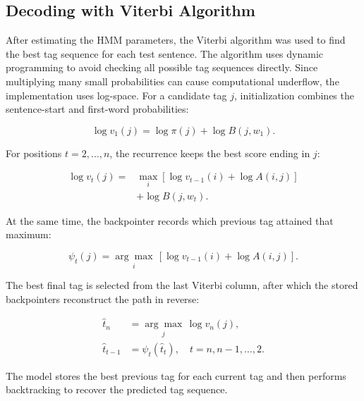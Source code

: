\documentclass[12pt,a4paper]{article}
\newcommand{\subsectionbreakguard}{\Needspace{7\baselineskip}}
\begin{document}
\subsectionbreakguard
\subsection{Decoding with Viterbi Algorithm}

After estimating the HMM parameters, the Viterbi algorithm was used to find the
best tag sequence for each test sentence. The algorithm uses dynamic programming
to avoid checking all possible tag sequences directly. Since multiplying many
small probabilities can cause computational underflow, the implementation uses
log-space. For a candidate tag $j$, initialization combines the sentence-start
and first-word probabilities:

\begin{equation}
\log v_1(j) = \log \pi(j) + \log B(j,w_1).
\end{equation}

For positions $t=2,\ldots,n$, the recurrence keeps the best score ending in
$j$:

\begin{equation}
\begin{aligned}
\log v_t(j) ={} &\max_i \left[\log v_{t-1}(i)
                    + \log A(i,j)\right] \\
                  &+ \log B(j,w_t).
\end{aligned}
\end{equation}

At the same time, the backpointer records which previous tag attained that
maximum:

\begin{equation}
\psi_t(j) = \underset{i}{\arg\max}\,
\left[\log v_{t-1}(i) + \log A(i,j)\right].
\end{equation}

The best final tag is selected from the last Viterbi column, after which the
stored backpointers reconstruct the path in reverse:

\begin{equation}
\begin{aligned}
\hat{t}_n &= \underset{j}{\arg\max}\,\log v_n(j), \\
\hat{t}_{t-1} &= \psi_t(\hat{t}_t),
\quad t=n,n-1,\ldots,2.
\end{aligned}
\end{equation}

The model stores the best previous tag for each current tag and then performs
backtracking to recover the predicted tag sequence.
\end{document}

